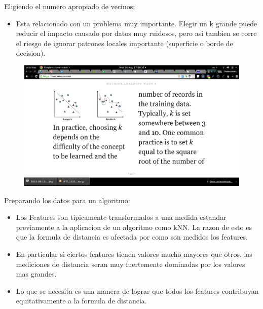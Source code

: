 \documentclass[ignorenonframetext,]{beamer}
\providecommand{\tightlist}{%
  \setlength{\itemsep}{0pt}\setlength{\parskip}{0pt}}
\begin{document}
\begin{frame}

\begin{block}{Eligiendo el numero apropiado de vecinos:}

\begin{itemize}
\tightlist
\item
  Esta relacionado con un problema muy importante. Elegir un k grande
  puede reducir el impacto causado por datos muy ruidosos, pero asi
  tambien se corre el riesgo de ignorar patrones locales importante
  (superficie o borde de decision).
\end{itemize}

\begin{figure}
\centering
\includegraphics{./number-of-knn.png}
\caption{}
\end{figure}

\end{block}

\end{frame}

\begin{frame}

\begin{block}{Preparando los datos para un algoritmo:}

\begin{itemize}
\item
  Los Features son tipicamente transformados a una medida estandar
  previamente a la aplicacion de un algoritmo como kNN. La razon de esto
  es que la formula de distancia es afectada por como son medidos los
  features.
\item
  En particular si ciertos features tienen valores mucho mayores que
  otros, las mediciones de distancia seran muy fuertemente dominadas por
  los valores mas grandes.
\item
  Lo que se necesita es una manera de lograr que todos los features
  contribuyan equitativamente a la formula de distancia.
\end{itemize}

\end{block}

\end{frame}
\end{document}

